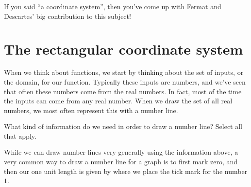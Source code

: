 \documentclass{ximera}
\begin{document}
If you said ``a coordinate system'', then you've come up with Fermat and Descartes' big contribution to this subject!

\section{The rectangular coordinate system}
When we think about functions, we start by thinking about the set of inputs, or the domain, for our function. Typically these inputs are numbers, and we've seen that often these numbers come from the real numbers. In fact, most of the time the inputs can come from any real number. When we draw the set of all real numbers, we most often represent this with a number line. 
\begin{question}
What kind of information do we need in order to draw a number line? Select all that apply.
\begin{selectAll}
\end{selectAll}
\end{question}
While we can draw number lines very generally using the information above, a very common way to draw  a number line for a graph is to first mark zero, and then our one unit length is given by where we place the tick mark for the number $1$.
\begin{image}
\end{image}
\end{document}
